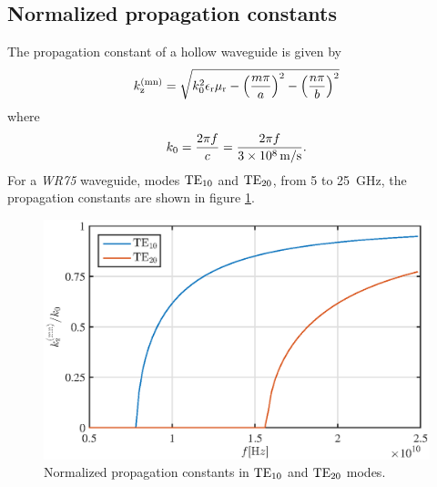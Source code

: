 \subsection{Normalized propagation constants}
The propagation constant of a hollow waveguide is given by
\begin{equation}
k_{\rm z}^{\rm (mn)} = \sqrt{k_{\rm 0}^{\rm 2} \epsilon_{\rm r} \mu_{\rm r} - \left(\frac{m \pi}{a}\right)^{\rm 2} - \left(\frac{n \pi}{b}\right)^{\rm 2}}
\end{equation}
where
\begin{equation}
k_{\rm 0} = \frac{2 \pi f}{c} = \frac{2 \pi f}{\SI{3e8}{\meter\slash\second}}.
\end{equation}
For a \emph{WR75} waveguide, modes $\rm TE_{10}$ and $\rm TE_{20}$, from \SI{5}{} to \SI{25}{\giga\hertz}, the propagation constants are shown in figure \ref{fig:prop_const}.

\begin{figure}[h t b p]
\centering
\includegraphics[width=\textwidth,keepaspectratio]{figures/prop_const.eps}
\caption{Normalized propagation constants in $\rm TE_{10}$ and $\rm TE_{20}$ modes.}
\label{fig:prop_const}
\end{figure}